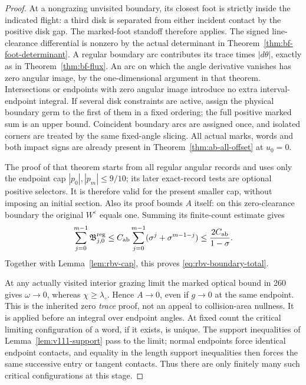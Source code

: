 \begin{proof}
At a nongrazing unvisited boundary, its closest foot is strictly
inside the indicated flight: a third disk is separated from either
incident contact by the positive disk gap.  The marked-foot
standoff therefore applies.  The signed line-clearance differential
is nonzero by the actual determinant in
Theorem~\ref{thm:bf-foot-determinant}.  A regular boundary arc
contributes its trace times $|d\theta|$, exactly as in
Theorem~\ref{thm:bf-flux}.  An arc on which the angle derivative
vanishes has zero angular image, by the one-dimensional argument
in that theorem.  Intersections or endpoints with zero angular
image introduce no extra interval-endpoint integral.  If several
disk constraints are active, assign the physical boundary germ to
the first of them in a fixed ordering; the full positive marked
sum is an upper bound.  Coincident boundary arcs are assigned once,
and isolated corners are treated by the same fixed-angle slicing.
All actual marks, words and both impact signs are already present
in Theorem~\ref{thm:ab-all-offset} at $u_0=0$.

The proof of that theorem starts from all regular angular records
and uses only the endpoint cap $|p_0|,|p_m|\le9/10$; its later
exact-record tests are optional positive selectors.  It is therefore
valid for the present smaller cap, without imposing an initial
section.  Also its proof bounds $A$ itself: on this zero-clearance
boundary the original $W^\varepsilon$ equals one.  Summing its
finite-count estimate gives
\[
 \sum_{j=0}^{m-1}\mathfrak B^{\rm reg}_{j,0}
    \le C_{\rm ab}\sum_{j=0}^{m-1}
                 (\sigma^j+\sigma^{m-1-j})
    \le\frac{2C_{\rm ab}}{1-\sigma}.
\]
Together with Lemma~\ref{lem:rbv-cap}, this proves
\eqref{eq:rbv-boundary-total}.

At any actually visited interior grazing limit the marked optical
bound in 260 gives $\omega\to0$, whereas
$\chi\ge\lambda_\circ$.  Hence $A\to0$, even if $g\to0$ at
the same endpoint.  This is the inherited zero \emph{trace}
proof, not an appeal to collision-area nullness.  It is applied
before an integral over endpoint angles.  At fixed count the
critical limiting configuration of a word, if it exists, is
unique.  The support inequalities of
Lemma~\ref{lem:v111-support} pass to the limit; normal endpoints
force identical endpoint contacts, and equality in the length
support inequalities then forces the same successive entry or
tangent contacts.  Thus there are only finitely many such critical
configurations at this stage.


\end{proof}
